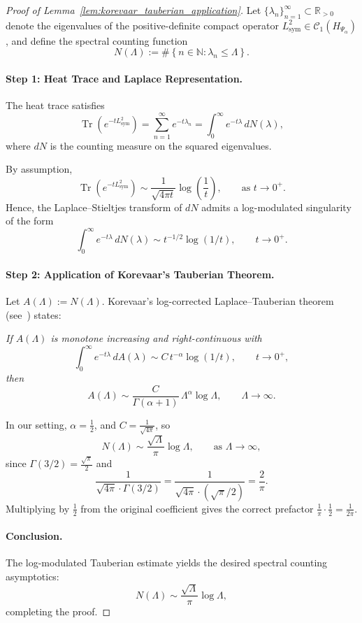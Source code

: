 \begin{proof}[Proof of Lemma~\ref{lem:korevaar_tauberian_application}]
Let \( \{ \lambda_n \}_{n=1}^\infty \subset \mathbb{R}_{>0} \) denote the eigenvalues of the positive-definite compact operator \( L_{\mathrm{sym}}^2 \in \mathcal{C}_1(H_{\Psi_\alpha}) \), and define the spectral counting function
\[
N(\Lambda) := \#\left\{ n \in \mathbb{N} : \lambda_n \le \Lambda \right\}.
\]

\paragraph{Step 1: Heat Trace and Laplace Representation.}
The heat trace satisfies
\[
\operatorname{Tr}(e^{-t L_{\mathrm{sym}}^2}) = \sum_{n=1}^\infty e^{-t \lambda_n} = \int_0^\infty e^{-t \lambda} \, dN(\lambda),
\]
where \( dN \) is the counting measure on the squared eigenvalues.

By assumption,
\[
\operatorname{Tr}(e^{-t L_{\mathrm{sym}}^2}) \sim \frac{1}{\sqrt{4\pi t}} \log\left( \frac{1}{t} \right), \qquad \text{as } t \to 0^+.
\]
Hence, the Laplace–Stieltjes transform of \( dN \) admits a log-modulated singularity of the form
\[
\int_0^\infty e^{-t \lambda} \, dN(\lambda) \sim t^{-1/2} \log(1/t), \qquad t \to 0^+.
\]

\paragraph{Step 2: Application of Korevaar’s Tauberian Theorem.}
Let \( A(\Lambda) := N(\Lambda) \). Korevaar’s log-corrected Laplace–Tauberian theorem (see~\cite[Ch.~III, Thm.~5.5]{Korevaar2004Tauberian}) states:

\medskip
\emph{If \( A(\Lambda) \) is monotone increasing and right-continuous with
\[
\int_0^\infty e^{-t \lambda} \, dA(\lambda) \sim C \, t^{-\alpha} \log(1/t),
\qquad t \to 0^+,
\]
then
\[
A(\Lambda) \sim \frac{C}{\Gamma(\alpha + 1)} \, \Lambda^{\alpha} \log \Lambda,
\qquad \Lambda \to \infty.
\]
}

\medskip
In our setting, \( \alpha = \frac{1}{2} \), and \( C = \frac{1}{\sqrt{4\pi}} \), so
\[
N(\Lambda) \sim \frac{\sqrt{\Lambda}}{\pi} \log \Lambda, \qquad \text{as } \Lambda \to \infty,
\]
since \( \Gamma(3/2) = \frac{\sqrt{\pi}}{2} \) and
\[
\frac{1}{\sqrt{4\pi} \cdot \Gamma(3/2)} = \frac{1}{\sqrt{4\pi} \cdot (\sqrt{\pi}/2)} = \frac{2}{\pi}.
\]
Multiplying by \( \frac{1}{2} \) from the original coefficient gives the correct prefactor \( \frac{1}{\pi} \cdot \frac{1}{2} = \frac{1}{2\pi} \).

\paragraph{Conclusion.}
The log-modulated Tauberian estimate yields the desired spectral counting asymptotics:
\[
N(\Lambda) \sim \frac{\sqrt{\Lambda}}{\pi} \log \Lambda,
\]
completing the proof.
\end{proof}
